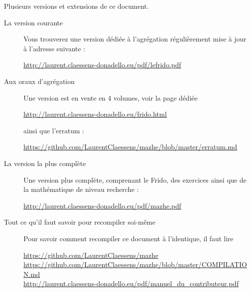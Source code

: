 
\thispagestyle{empty}

Plusieurs versions et extensions de ce document.
\begin{description}

    \item[La version courante] 

        Vous trouverez une version dédiée à l'agrégation régulièrement mise à jour à l'adresse suivante :
        \begin{center}
            \url{http://laurent.claessens-donadello.eu/pdf/lefrido.pdf}
        \end{center}

    \item[Aux oraux d'agrégation]

        Une version est en vente en 4 volumes, voir la page dédiée
        \begin{center}
            \url{http://laurent.claessens-donadello.eu/frido.html}
        \end{center}
        ainsi que l'erratum :
        \begin{center}
            \url{https://github.com/LaurentClaessens/mazhe/blob/master/erratum.md}
        \end{center}

    \item[La version la plus complète]

        Une version plus complète, comprenant le Frido, des exercices ainsi que de la mathématique de niveau recherche :
        \begin{center}
        \url{http://laurent.claessens-donadello.eu/pdf/mazhe.pdf}
        \end{center}

    \item[Tout ce qu'il faut savoir pour recompiler soi-même]
        Pour savoir comment recompiler ce document à l'identique, il faut lire
        \begin{center}
            \url{https://github.com/LaurentClaessens/mazhe}\\
            \url{https://github.com/LaurentClaessens/mazhe/blob/master/COMPILATION.md}\\
            \url{http://laurent.claessens-donadello.eu/pdf/manuel_du_contributeur.pdf}
        \end{center}

\end{description}
